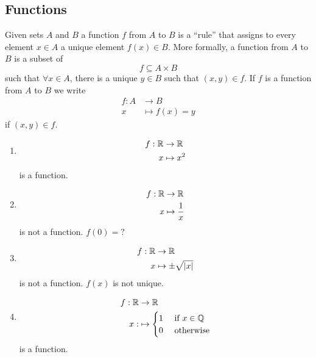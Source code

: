 \documentclass{article}
\begin{document}
\subsection{Functions}

Given sets $A$ and $B$ a function $f$ from $A$ to $B$ is a ``rule'' that assigns to every element $x \in A$ a unique element $f(x) \in B$.
More formally, a function from $A$ to $B$ is a subset of
\[
    f \subseteq A \times B
\]
such that $\forall x \in A$, there is a unique $y \in B$ such that $(x, y) \in f$.
If $f$ is a function from $A$ to $B$ we write
\begin{align*}
    f : A &\rightarrow B \\
    x &\mapsto f(x) = y
\end{align*}
if $(x, y) \in f$.

\begin{eg}\leavevmode
    \begin{enumerate}[label=(\arabic*)]
        \item \begin{align*}
            f : \mathbb{R} &\rightarrow \mathbb{R} \\
            x &\mapsto x^2
        \end{align*}
        is a function.

        \item \begin{align*}
            f : \mathbb{R} &\rightarrow \mathbb{R} \\
            x &\mapsto \frac{1}{x}
        \end{align*}
        is not a function. $f(0) = ?$

        \item \begin{align*}
            f : \mathbb{R} &\rightarrow \mathbb{R} \\
            x &\mapsto \pm \sqrt{\left\lvert x\right\rvert}
        \end{align*}
        is not a function. $f(x)$ is not unique.

        \item \begin{align*}
            f : \mathbb{R} &\rightarrow \mathbb{R} \\
            x: &\mapsto \begin{cases}
                1 & \text{ if } x \in \mathbb{Q} \\
                0 & \text{ otherwise}
            \end{cases}
        \end{align*}
        is a function.


\end{enumerate}
\end{eg}
\end{document}
